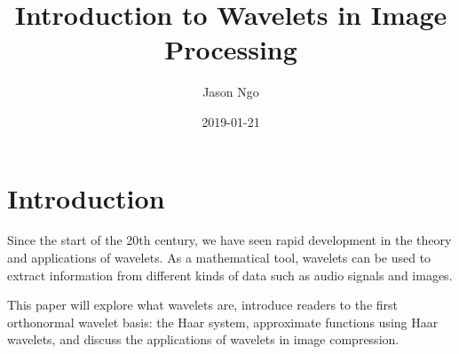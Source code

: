 \documentclass[11pt]{amsart}
\title{Introduction to Wavelets in Image Processing}
\author{Jason Ngo}
\date{2019-01-21}
\theoremstyle{theorem} %
\theoremstyle{definition}                  %
\theoremstyle{example}                       %
\theoremstyle{remark}                       %
\numberwithin{equation}{section}
\newcommand{\R}{\mathbb{R}}
\begin{document}
\maketitle

\section{Introduction}
Since the start of the 20th century, we have seen rapid development in the theory and applications of wavelets. As a mathematical tool, wavelets can be used to extract information from different kinds of data such as audio signals and images.

This paper will explore what wavelets are, introduce readers to the first orthonormal wavelet basis: the Haar system, approximate functions using Haar wavelets, and discuss the applications of wavelets in image compression.


%
\end{document}
